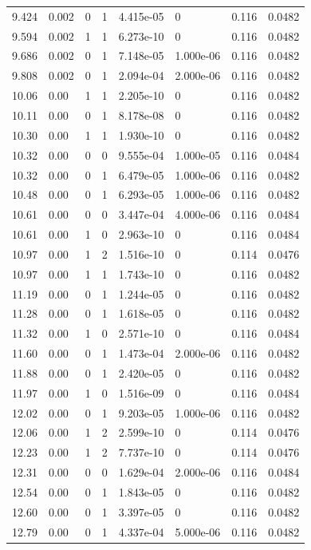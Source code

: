 \documentclass[preview]{standalone}
\begin{document}
{{{\begin{tabular}{L{1.2cm}C{1.2cm} C{0.3cm}C{0.5cm} C{1.4cm}C{1.4cm} C{1.4cm}C{1.4cm}}
  9.424  &  0.002  & 0     &  1 &  4.415e-05  & 0  & 0.116 &  0.0482   \\ 
  9.594  &  0.002  & 1     &  1 &  6.273e-10  & 0  & 0.116 &  0.0482   \\ 
  9.686  &  0.002  & 0     &  1 &  7.148e-05  & 1.000e-06  & 0.116 &  0.0482   \\ 
  9.808  &  0.002  & 0     &  1 &  2.094e-04  & 2.000e-06  & 0.116 &  0.0482   \\ 
  10.06  &  0.00  & 1     &  1 &  2.205e-10  & 0  & 0.116 &  0.0482   \\ 
  10.11  &  0.00  & 0     &  1 &  8.178e-08  & 0  & 0.116 &  0.0482   \\ 
  10.30  &  0.00  & 1     &  1 &  1.930e-10  & 0  & 0.116 &  0.0482   \\ 
  10.32  &  0.00  & 0     &  0 &  9.555e-04  & 1.000e-05  & 0.116 &  0.0484   \\ 
  10.32  &  0.00  & 0     &  1 &  6.479e-05  & 1.000e-06  & 0.116 &  0.0482   \\ 
  10.48  &  0.00  & 0     &  1 &  6.293e-05  & 1.000e-06  & 0.116 &  0.0482   \\ 
  10.61  &  0.00  & 0     &  0 &  3.447e-04  & 4.000e-06  & 0.116 &  0.0484   \\ 
  10.61  &  0.00  & 1     &  0 &  2.963e-10  & 0  & 0.116 &  0.0484   \\ 
  10.97  &  0.00  & 1     &  2 &  1.516e-10  & 0  & 0.114 &  0.0476   \\ 
  10.97  &  0.00  & 1     &  1 &  1.743e-10  & 0  & 0.116 &  0.0482   \\ 
  11.19  &  0.00  & 0     &  1 &  1.244e-05  & 0  & 0.116 &  0.0482   \\ 
  11.28  &  0.00  & 0     &  1 &  1.618e-05  & 0  & 0.116 &  0.0482   \\ 
  11.32  &  0.00  & 1     &  0 &  2.571e-10  & 0  & 0.116 &  0.0484   \\ 
  11.60  &  0.00  & 0     &  1 &  1.473e-04  & 2.000e-06  & 0.116 &  0.0482   \\ 
  11.88  &  0.00  & 0     &  1 &  2.420e-05  & 0  & 0.116 &  0.0482   \\ 
  11.97  &  0.00  & 1     &  0 &  1.516e-09  & 0  & 0.116 &  0.0484   \\ 
  12.02  &  0.00  & 0     &  1 &  9.203e-05  & 1.000e-06  & 0.116 &  0.0482   \\ 
  12.06  &  0.00  & 1     &  2 &  2.599e-10  & 0  & 0.114 &  0.0476   \\ 
  12.23  &  0.00  & 1     &  2 &  7.737e-10  & 0  & 0.114 &  0.0476   \\ 
  12.31  &  0.00  & 0     &  0 &  1.629e-04  & 2.000e-06  & 0.116 &  0.0484   \\ 
  12.54  &  0.00  & 0     &  1 &  1.843e-05  & 0  & 0.116 &  0.0482   \\ 
  12.60  &  0.00  & 0     &  1 &  3.397e-05  & 0  & 0.116 &  0.0482   \\ 
  12.79  &  0.00  & 0     &  1 &  4.337e-04  & 5.000e-06  & 0.116 &  0.0482   \\ 
\hline 
\end{tabular} 

}}}
\end{document}
